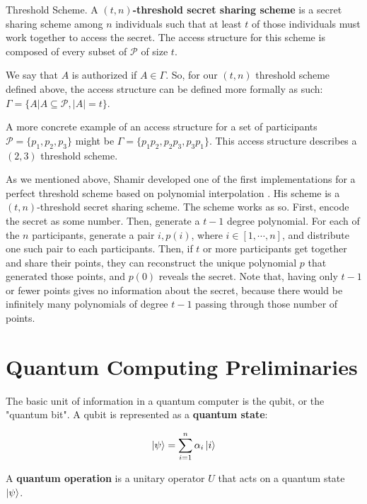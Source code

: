 \theoremstyle{definition}
\begin{definition}{Threshold Scheme.}
    \label{defn:threshold-scheme}
    A \textbf{$(t,n)$-threshold secret sharing scheme} is a secret sharing scheme among $n$ individuals such that at least $t$ of those individuals must work together to access the secret. The access structure for this scheme is composed of every subset of $\mathcal{P}$ of size $t$.
\end{definition}

We say that $A$ is authorized if $A \in \Gamma$. So, for our $(t,n)$ threshold scheme defined above, the access structure can be defined more formally as such: $\Gamma = \{A | A \subseteq \mathcal{P} , |A| = t\}$.

A more concrete example of an access structure for a set of participants $\mathcal{P} = \{p_1,p_2,p_3\}$ might be $\Gamma = \{p_1p_2,p_2p_3,p_3p_1\}$. This access structure describes a $(2,3)$ threshold scheme.

As we mentioned above, Shamir developed one of the first implementations for a perfect threshold scheme based on polynomial interpolation \cite{shamir}. His scheme is a $(t,n)$-threshold secret sharing scheme. The scheme works as so. First, encode the secret as some number. Then, generate a $t-1$ degree polynomial. For each of the $n$ participants, generate a pair $i, p(i)$, where $i \in [1, \cdots, n]$, and distribute one such pair to each participants. Then, if $t$ or more participants get together and share their points, they can reconstruct the unique polynomial $p$ that generated those points, and $p(0)$ reveals the secret. Note that, having only $t-1$ or fewer points gives no information about the secret, because there would be infinitely many polynomials of degree $t-1$ passing through those number of points.

\section{Quantum Computing Preliminaries}

The basic unit of information in a quantum computer is the qubit, or the "quantum bit". A qubit is represented as a \textbf{quantum state}:

\begin{align*}
    \ket{\psi} &= \sum_{i=1}^n \alpha_i\ket{i} \\ 
\end{align*}

A \textbf{quantum operation} is a unitary operator $U$ that acts on a quantum state $\ket{\psi}$.


